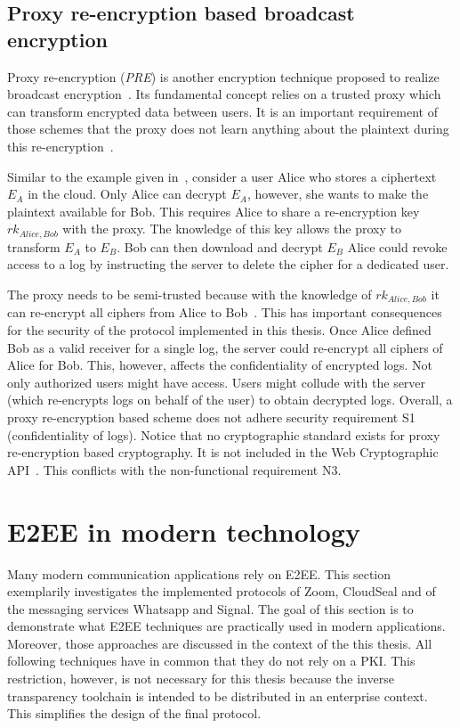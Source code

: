\documentclass[../main.tex]{subfiles}
\begin{document}
\subsection{Proxy re-encryption based broadcast encryption}
\label{sec:broadcast-proxy}
Proxy re-encryption (\emph{PRE}) is another encryption technique proposed to realize broadcast encryption~\cite{Hagg2022}.
Its fundamental concept relies on a trusted proxy which can transform encrypted data between users.
It is an important requirement of those schemes that the proxy does not learn anything about the plaintext during this re-encryption~\cite{Chen2018}.

Similar to the example given in~\cite{Hagg2022}, consider a user Alice who stores a ciphertext $E_A$ in the cloud.
Only Alice can decrypt $E_A$, however, she wants to make the plaintext available for Bob.
This requires Alice to share a re-encryption key $rk_{Alice,Bob}$ with the proxy.
The knowledge of this key allows the proxy to transform $E_A$ to $E_B$.
Bob can then download and decrypt $E_B$
Alice could revoke access to a log by instructing the server to delete the cipher for a dedicated user.

The proxy needs to be semi-trusted because with the knowledge of $rk_{Alice,Bob}$ it can re-encrypt all ciphers from Alice to Bob~\cite{Chen2018}.
This has important consequences for the security of the protocol implemented in this thesis.
Once Alice defined Bob as a valid receiver for a single log, the server could re-encrypt all ciphers of Alice for Bob.
This, however, affects the confidentiality of encrypted logs.
Not only authorized users might have access.
Users might collude with the server (which re-encrypts logs on behalf of the user) to obtain decrypted logs.
Overall, a proxy re-encryption based scheme does not adhere security requirement S1 (confidentiality of logs).
Notice that no cryptographic standard exists for proxy re-encryption based cryptography.
It is not included in the Web Cryptographic API~\cite{WebCryptoApi2017}.
This conflicts with the non-functional requirement N3.

\section{E2EE in modern technology}
\label{sec:modern-e2ee}

Many modern communication applications rely on E2EE. 
This section exemplarily investigates the implemented protocols of Zoom, CloudSeal and of the messaging services Whatsapp and Signal.
The goal of this section is to demonstrate what E2EE techniques are practically used in modern applications.
Moreover, those approaches are discussed in the context of the this thesis.
All following techniques have in common that they do not rely on a PKI.
This restriction, however, is not necessary for this thesis because the inverse transparency toolchain is intended to be distributed in an enterprise context.
This simplifies the design of the final protocol.
\end{document}

